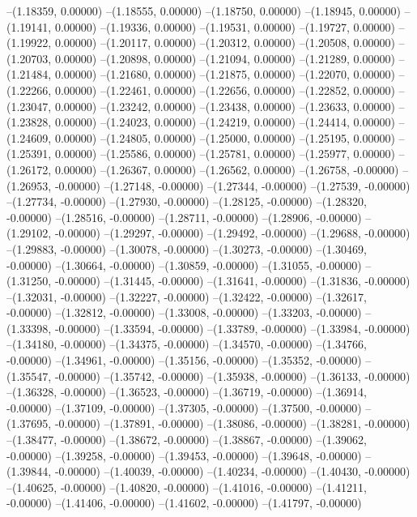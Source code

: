 --(1.18359, 0.00000)
--(1.18555, 0.00000)
--(1.18750, 0.00000)
--(1.18945, 0.00000)
--(1.19141, 0.00000)
--(1.19336, 0.00000)
--(1.19531, 0.00000)
--(1.19727, 0.00000)
--(1.19922, 0.00000)
--(1.20117, 0.00000)
--(1.20312, 0.00000)
--(1.20508, 0.00000)
--(1.20703, 0.00000)
--(1.20898, 0.00000)
--(1.21094, 0.00000)
--(1.21289, 0.00000)
--(1.21484, 0.00000)
--(1.21680, 0.00000)
--(1.21875, 0.00000)
--(1.22070, 0.00000)
--(1.22266, 0.00000)
--(1.22461, 0.00000)
--(1.22656, 0.00000)
--(1.22852, 0.00000)
--(1.23047, 0.00000)
--(1.23242, 0.00000)
--(1.23438, 0.00000)
--(1.23633, 0.00000)
--(1.23828, 0.00000)
--(1.24023, 0.00000)
--(1.24219, 0.00000)
--(1.24414, 0.00000)
--(1.24609, 0.00000)
--(1.24805, 0.00000)
--(1.25000, 0.00000)
--(1.25195, 0.00000)
--(1.25391, 0.00000)
--(1.25586, 0.00000)
--(1.25781, 0.00000)
--(1.25977, 0.00000)
--(1.26172, 0.00000)
--(1.26367, 0.00000)
--(1.26562, 0.00000)
--(1.26758, -0.00000)
--(1.26953, -0.00000)
--(1.27148, -0.00000)
--(1.27344, -0.00000)
--(1.27539, -0.00000)
--(1.27734, -0.00000)
--(1.27930, -0.00000)
--(1.28125, -0.00000)
--(1.28320, -0.00000)
--(1.28516, -0.00000)
--(1.28711, -0.00000)
--(1.28906, -0.00000)
--(1.29102, -0.00000)
--(1.29297, -0.00000)
--(1.29492, -0.00000)
--(1.29688, -0.00000)
--(1.29883, -0.00000)
--(1.30078, -0.00000)
--(1.30273, -0.00000)
--(1.30469, -0.00000)
--(1.30664, -0.00000)
--(1.30859, -0.00000)
--(1.31055, -0.00000)
--(1.31250, -0.00000)
--(1.31445, -0.00000)
--(1.31641, -0.00000)
--(1.31836, -0.00000)
--(1.32031, -0.00000)
--(1.32227, -0.00000)
--(1.32422, -0.00000)
--(1.32617, -0.00000)
--(1.32812, -0.00000)
--(1.33008, -0.00000)
--(1.33203, -0.00000)
--(1.33398, -0.00000)
--(1.33594, -0.00000)
--(1.33789, -0.00000)
--(1.33984, -0.00000)
--(1.34180, -0.00000)
--(1.34375, -0.00000)
--(1.34570, -0.00000)
--(1.34766, -0.00000)
--(1.34961, -0.00000)
--(1.35156, -0.00000)
--(1.35352, -0.00000)
--(1.35547, -0.00000)
--(1.35742, -0.00000)
--(1.35938, -0.00000)
--(1.36133, -0.00000)
--(1.36328, -0.00000)
--(1.36523, -0.00000)
--(1.36719, -0.00000)
--(1.36914, -0.00000)
--(1.37109, -0.00000)
--(1.37305, -0.00000)
--(1.37500, -0.00000)
--(1.37695, -0.00000)
--(1.37891, -0.00000)
--(1.38086, -0.00000)
--(1.38281, -0.00000)
--(1.38477, -0.00000)
--(1.38672, -0.00000)
--(1.38867, -0.00000)
--(1.39062, -0.00000)
--(1.39258, -0.00000)
--(1.39453, -0.00000)
--(1.39648, -0.00000)
--(1.39844, -0.00000)
--(1.40039, -0.00000)
--(1.40234, -0.00000)
--(1.40430, -0.00000)
--(1.40625, -0.00000)
--(1.40820, -0.00000)
--(1.41016, -0.00000)
--(1.41211, -0.00000)
--(1.41406, -0.00000)
--(1.41602, -0.00000)
--(1.41797, -0.00000)

